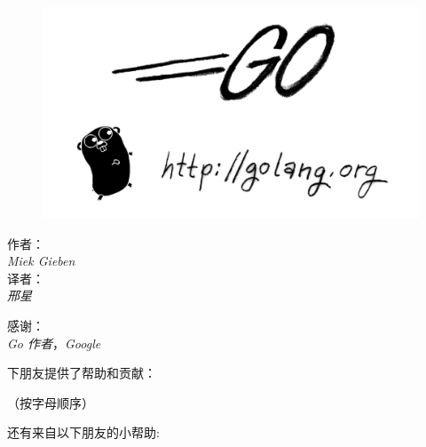 \documentclass[a4paper,twoside,openleft]{blocksbook}
\begin{document}
\thispagestyle{empty}
\newcommand{\version}{1.0}
\strictpagecheck

\begin{center}
\\
\end{center}
\vspace*{2cm}
\begin{figure}[h!]
\begin{center}
    \includegraphics[scale=0.65]{fig/bumper-inverse.png}
\end{center}
\end{figure}
\vspace*{0.02\stockheight}
\begin{minipage}{0.4\textwidth}
\begin{flushleft} \large
\hspace*{2,0cm}作者：\\
\hspace*{2.0cm}\emph{Miek Gieben}\\
\hspace*{2.0cm}译者：\\
\hspace*{2.0cm}\emph{邢星}\\
\vfill
\end{flushleft}
\end{minipage}
\hspace{5mm}
\begin{minipage}{0.4\textwidth}
\begin{flushright} \large
感谢：\\
\emph{Go 作者}，\emph{Google}\\
\vfill
\end{flushright}
\end{minipage}
\vspace*{0.5cm}
\begin{center}
下朋友提供了帮助和贡献：

（{\small 按字母顺序}）


还有来自以下朋友的小帮助:


\end{center}
\end{document}
